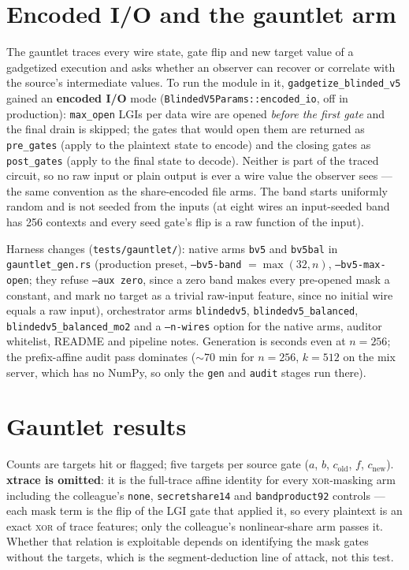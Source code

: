 \documentclass[11pt]{article}
\newcommand{\doc}[1]{\texttt{#1}}
\begin{document}
\section{Encoded I/O and the gauntlet arm}

The gauntlet traces every wire state, gate flip and new target value of a gadgetized
execution and asks whether an observer can recover or correlate with the source's
intermediate values. To run the module in it, \doc{gadgetize\_blinded\_v5} gained an
\textbf{encoded I/O} mode (\doc{BlindedV5Params::encoded\_io}, off in production):
\doc{max\_open} LGIs per data wire are opened \emph{before the first gate} and the final
drain is skipped; the gates that would open them are returned as \doc{pre\_gates} (apply to
the plaintext state to encode) and the closing gates as \doc{post\_gates} (apply to the final
state to decode). Neither is part of the traced circuit, so no raw input or plain output is
ever a wire value the observer sees --- the same convention as the share-encoded file arms.
The band starts uniformly random and is not seeded from the inputs (at eight wires an
input-seeded band has 256 contexts and every seed gate's flip is a raw function of the
input).

Harness changes (\doc{tests/gauntlet/}): native arms \doc{bv5} and \doc{bv5bal} in
\doc{gauntlet\_gen.rs} (production preset, \doc{--bv5-band} $=\max(32,n)$,
\doc{--bv5-max-open}; they refuse \doc{--aux zero}, since a zero band makes every pre-opened
mask a constant, and mark no target as a trivial raw-input feature, since no initial wire
equals a raw input), orchestrator arms \doc{blindedv5}, \doc{blindedv5\_balanced},
\doc{blindedv5\_balanced\_mo2} and a \doc{--n-wires} option for the native arms, auditor
whitelist, README and pipeline notes. Generation is seconds even at $n=256$; the
prefix-affine audit pass dominates (${\sim}70$ min for $n=256$, $k=512$ on the mix server,
which has no NumPy, so only the \doc{gen} and \doc{audit} stages run there).

\section{Gauntlet results}

Counts are targets hit or flagged; five targets per source gate ($a$, $b$, $c_{\mathrm{old}}$,
$f$, $c_{\mathrm{new}}$). \textbf{xtrace is omitted}: it is the full-trace affine identity
for every \textsc{xor}-masking arm including the colleague's \doc{none}, \doc{secretshare14}
and \doc{bandproduct92} controls --- each mask term is the flip of the LGI gate that applied
it, so every plaintext is an exact \textsc{xor} of trace features; only the colleague's
nonlinear-share arm passes it. Whether that relation is exploitable depends on identifying the
mask gates without the targets, which is the segment-deduction line of attack, not this test.
\end{document}
